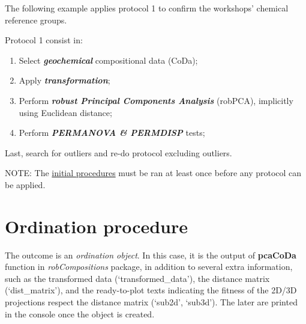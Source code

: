 \documentclass[12pt,]{book}
\newenvironment{Shaded}{\begin{snugshade}}{\end{snugshade}}
\newcommand{\CommentTok}[1]{\textcolor[rgb]{0.56,0.35,0.01}{\textit{#1}}}
\newcommand{\DataTypeTok}[1]{\textcolor[rgb]{0.13,0.29,0.53}{#1}}
\newcommand{\KeywordTok}[1]{\textcolor[rgb]{0.13,0.29,0.53}{\textbf{#1}}}
\newcommand{\NormalTok}[1]{#1}
\newcommand{\OperatorTok}[1]{\textcolor[rgb]{0.81,0.36,0.00}{\textbf{#1}}}
\newcommand{\StringTok}[1]{\textcolor[rgb]{0.31,0.60,0.02}{#1}}
\providecommand{\tightlist}{%
  \setlength{\itemsep}{0pt}\setlength{\parskip}{0pt}}
\begin{document}
The following example applies protocol 1 to confirm the workshops' chemical reference groups.

Protocol 1 consist in:

\begin{enumerate}
\def\labelenumi{\arabic{enumi}.}
\tightlist
\item
  Select \textbf{\emph{geochemical}} compositional data (CoDa);
\item
  Apply \textbf{\emph{transformation}};
\item
  Perform \textbf{\emph{robust Principal Components Analysis}} (robPCA), implicitly using Euclidean distance;
\item
  Perform \textbf{\emph{PERMANOVA \& PERMDISP}} tests;
\end{enumerate}

Last, search for outliers and re-do protocol excluding outliers.

NOTE: The \protect\hyperlink{init}{initial procedures} must be ran at least once before any protocol can be applied.

\hypertarget{ordination-procedure}{%
\section{Ordination procedure}\label{ordination-procedure}}

\begin{Shaded}
\end{Shaded}

The outcome is an \emph{ordination object}. In this case, it is the output of \textbf{pcaCoDa} function in \emph{robCompositions} package, in addition to several extra information, such as the transformed data (`transformed\_data'), the distance matrix (`dist\_matrix'), and the ready-to-plot texts indicating the fitness of the 2D/3D projections respect the distance matrix (`sub2d', `sub3d'). The later are printed in the console once the object is created.
\end{document}
